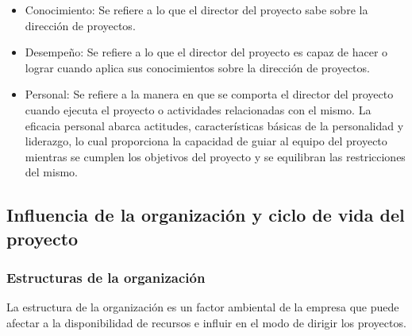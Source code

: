 \begin{itemize}

\item{Conocimiento: Se refiere a lo que el director del proyecto sabe sobre la dirección de proyectos.}

\item{Desempeño: Se refiere a lo que el director del proyecto es capaz de hacer o lograr cuando aplica sus 
conocimientos sobre la dirección de proyectos.}

\item{Personal: Se  refiere  a  la  manera  en  que  se  comporta  el  director  del  proyecto  cuando  ejecuta  
el  proyecto  o  actividades  relacionadas  con  el  mismo.  La  eficacia  personal  abarca  actitudes,  
características básicas de la personalidad y liderazgo, lo cual proporciona la capacidad de guiar al 
equipo del proyecto mientras se cumplen los objetivos del proyecto y se equilibran las restricciones 
del mismo.}

\end{itemize}

\newpage{}
\subsection{Influencia de la organización y ciclo de vida del proyecto}

\subsubsection{Estructuras de la organización}

La estructura de la organización es un factor ambiental de la empresa que puede afectar a la disponibilidad de recursos e influir en el modo de dirigir los proyectos.

